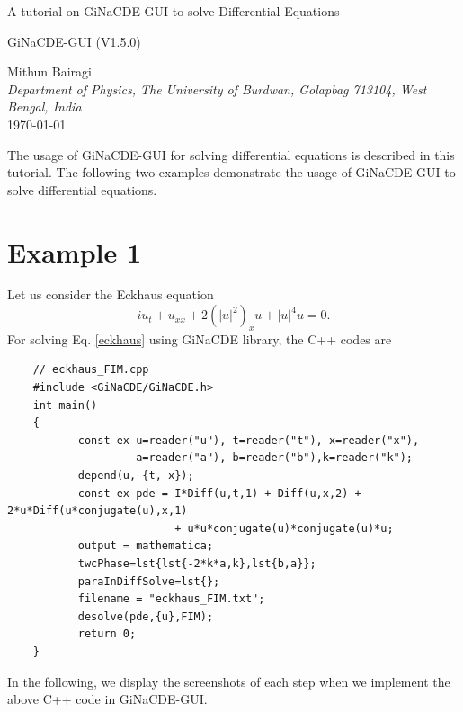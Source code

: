 \documentclass[11pt,a4paper,titlepage]{article}
\begin{document}
\begin{titlepage}
\begin{center}
\Huge {A tutorial on GiNaCDE-GUI to solve Differential Equations} 
\end{center}
\vspace{3cm}
\begin{center}
\Large{GiNaCDE-GUI (V1.5.0)}
\end{center}
\vspace{2cm} 
\begin{center} 
Mithun Bairagi \\[3pt]  
\textit{Department of Physics, The University of Burdwan, Golapbag 713104, West Bengal, India} \\ [1cm]
\today
\end{center}
\end{titlepage}
 
\clearpage
The usage of GiNaCDE-GUI for solving differential equations is described in this tutorial. The following two examples demonstrate the usage of GiNaCDE-GUI to solve differential equations.
\section{Example 1}
Let us consider the Eckhaus equation 
\begin{equation}\label{eckhaus}
	i{u_t} + {u_{xx}} + 2{\left( {{{\left| u \right|}^2}} \right)_x}u + {\left| u \right|^4}u = 0.
\end{equation}
For solving Eq. \eqref{eckhaus} using GiNaCDE library, the C++ codes are\\
\begin{verbatim}
	// eckhaus_FIM.cpp
	#include <GiNaCDE/GiNaCDE.h>
	int main()
	{
		   const ex u=reader("u"), t=reader("t"), x=reader("x"), 
		            a=reader("a"), b=reader("b"),k=reader("k");   
		   depend(u, {t, x});
		   const ex pde = I*Diff(u,t,1) + Diff(u,x,2) + 2*u*Diff(u*conjugate(u),x,1)
		                  + u*u*conjugate(u)*conjugate(u)*u;
		   output = mathematica;  
		   twcPhase=lst{lst{-2*k*a,k},lst{b,a}};
		   paraInDiffSolve=lst{};
		   filename = "eckhaus_FIM.txt";
		   desolve(pde,{u},FIM);
		   return 0;
	}
\end{verbatim}
In the following, we display the screenshots of each step when we implement the above C++ code in GiNaCDE-GUI.
\end{document}
